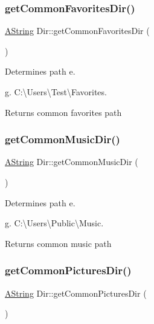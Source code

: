 \subsubsection{\texorpdfstring{getCommonFavoritesDir()}{getCommonFavoritesDir()}}
{\footnotesize\ttfamily \mbox{\hyperlink{class_a_string}{A\+String}} Dir\+::get\+Common\+Favorites\+Dir (\begin{DoxyParamCaption}{ }\end{DoxyParamCaption})\hspace{0.3cm}{\ttfamily [static]}}



Determines path e. 

g. C\+:\textbackslash{}\+Users\textbackslash{}\+Test\textbackslash{}\+Favorites. \begin{DoxyReturn}{Returns}
common favorites path 
\end{DoxyReturn}
\mbox{\label{class_dir_a7642f62fa4dd296f4ce84461f1977229}} 
\subsubsection{\texorpdfstring{getCommonMusicDir()}{getCommonMusicDir()}}
{\footnotesize\ttfamily \mbox{\hyperlink{class_a_string}{A\+String}} Dir\+::get\+Common\+Music\+Dir (\begin{DoxyParamCaption}{ }\end{DoxyParamCaption})\hspace{0.3cm}{\ttfamily [static]}}



Determines path e. 

g. C\+:\textbackslash{}\+Users\textbackslash{}\+Public\textbackslash{}\+Music. \begin{DoxyReturn}{Returns}
common music path 
\end{DoxyReturn}
\mbox{\label{class_dir_a4a09b54259500e114930201594c3ea11}} 
\subsubsection{\texorpdfstring{getCommonPicturesDir()}{getCommonPicturesDir()}}
{\footnotesize\ttfamily \mbox{\hyperlink{class_a_string}{A\+String}} Dir\+::get\+Common\+Pictures\+Dir (\begin{DoxyParamCaption}{ }\end{DoxyParamCaption})\hspace{0.3cm}{\ttfamily [static]}}



